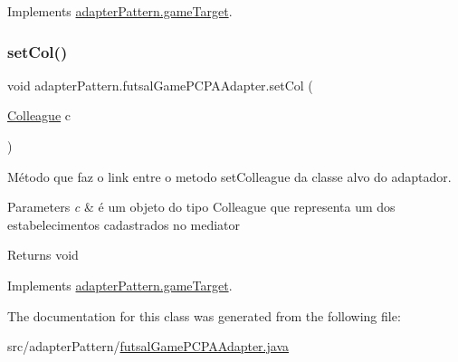 Implements \mbox{\hyperlink{interfaceadapter_pattern_1_1game_target_a9ea61c0d011aa457f9a8c887d086044a}{adapter\+Pattern.\+game\+Target}}.

\mbox{\label{classadapter_pattern_1_1futsal_game_p_c_p_a_adapter_a6349af17da6ad49b3bd5cd23db7e6e54}} 
\subsubsection{\texorpdfstring{setCol()}{setCol()}}
{\footnotesize\ttfamily void adapter\+Pattern.\+futsal\+Game\+P\+C\+P\+A\+Adapter.\+set\+Col (\begin{DoxyParamCaption}\item[{\mbox{\hyperlink{classmediator_pattern_1_1_colleague}{Colleague}}}]{c }\end{DoxyParamCaption})}



Método que faz o link entre o metodo set\+Colleague da classe alvo do adaptador. 


\begin{DoxyParams}{Parameters}
{\em c} & é um objeto do tipo Colleague que representa um dos estabelecimentos cadastrados no mediator \\
\hline
\end{DoxyParams}
\begin{DoxyReturn}{Returns}
void 
\end{DoxyReturn}


Implements \mbox{\hyperlink{interfaceadapter_pattern_1_1game_target_ae4493af8f85c0459e4e628ffff3fe3b9}{adapter\+Pattern.\+game\+Target}}.



The documentation for this class was generated from the following file\+:\begin{DoxyCompactItemize}
\item 
src/adapter\+Pattern/\mbox{\hyperlink{futsal_game_p_c_p_a_adapter_8java}{futsal\+Game\+P\+C\+P\+A\+Adapter.\+java}}\end{DoxyCompactItemize}
